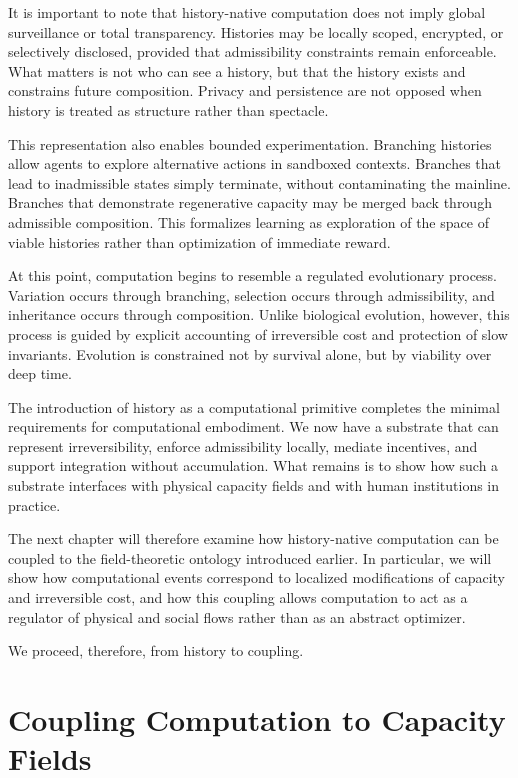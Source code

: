 \documentclass[12pt,oneside]{book}
\begin{document}
It is important to note that history-native computation does not imply global surveillance or total transparency. Histories may be locally scoped, encrypted, or selectively disclosed, provided that admissibility constraints remain enforceable. What matters is not who can see a history, but that the history exists and constrains future composition. Privacy and persistence are not opposed when history is treated as structure rather than spectacle.

This representation also enables bounded experimentation. Branching histories allow agents to explore alternative actions in sandboxed contexts. Branches that lead to inadmissible states simply terminate, without contaminating the mainline. Branches that demonstrate regenerative capacity may be merged back through admissible composition. This formalizes learning as exploration of the space of viable histories rather than optimization of immediate reward.

At this point, computation begins to resemble a regulated evolutionary process. Variation occurs through branching, selection occurs through admissibility, and inheritance occurs through composition. Unlike biological evolution, however, this process is guided by explicit accounting of irreversible cost and protection of slow invariants. Evolution is constrained not by survival alone, but by viability over deep time.

The introduction of history as a computational primitive completes the minimal requirements for computational embodiment. We now have a substrate that can represent irreversibility, enforce admissibility locally, mediate incentives, and support integration without accumulation. What remains is to show how such a substrate interfaces with physical capacity fields and with human institutions in practice.

The next chapter will therefore examine how history-native computation can be coupled to the field-theoretic ontology introduced earlier. In particular, we will show how computational events correspond to localized modifications of capacity and irreversible cost, and how this coupling allows computation to act as a regulator of physical and social flows rather than as an abstract optimizer.

We proceed, therefore, from history to coupling.

\chapter{Coupling Computation to Capacity Fields}
\end{document}
